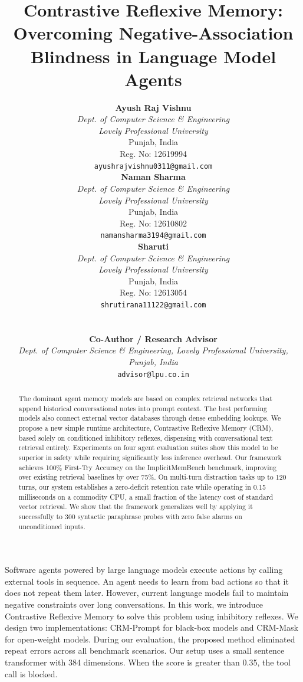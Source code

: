 \documentclass[10pt,conference]{IEEEtran}
\title{Contrastive Reflexive Memory: Overcoming Negative-Association Blindness in Language Model Agents}
\author{
\begin{minipage}{0.32\textwidth}
\centering
{\normalsize \textbf{Ayush Raj Vishnu}}\\[0.2ex]
{\small \textit{Dept. of Computer Science \& Engineering}}\\[0.1ex]
{\small \textit{Lovely Professional University}}\\[0.1ex]
{\small Punjab, India}\\[0.1ex]
{\small Reg. No: 12619994}\\[0.1ex]
{\footnotesize \texttt{ayushrajvishnu0311@gmail.com}}
\end{minipage}\hfill
\begin{minipage}{0.32\textwidth}
\centering
{\normalsize \textbf{Naman Sharma}}\\[0.2ex]
{\small \textit{Dept. of Computer Science \& Engineering}}\\[0.1ex]
{\small \textit{Lovely Professional University}}\\[0.1ex]
{\small Punjab, India}\\[0.1ex]
{\small Reg. No: 12610802}\\[0.1ex]
{\footnotesize \texttt{namansharma3194@gmail.com}}
\end{minipage}\hfill
\begin{minipage}{0.32\textwidth}
\centering
{\normalsize \textbf{Sharuti}}\\[0.2ex]
{\small \textit{Dept. of Computer Science \& Engineering}}\\[0.1ex]
{\small \textit{Lovely Professional University}}\\[0.1ex]
{\small Punjab, India}\\[0.1ex]
{\small Reg. No: 12613054}\\[0.1ex]
{\footnotesize \texttt{shrutirana11122@gmail.com}}
\end{minipage}\\[1.5ex]
\begin{minipage}{\textwidth}
\centering
{\normalsize \textbf{Co-Author / Research Advisor}}\\[0.2ex]
{\small \textit{Dept. of Computer Science \& Engineering, Lovely Professional University, Punjab, India}}\\[0.1ex]
{\footnotesize \texttt{advisor@lpu.co.in}}
\end{minipage}
}
\begin{document}
\maketitle

\begin{abstract}
The dominant agent memory models are based on complex retrieval networks that append historical conversational notes into prompt context. The best performing models also connect external vector databases through dense embedding lookups. We propose a new simple runtime architecture, Contrastive Reflexive Memory (CRM), based solely on conditioned inhibitory reflexes, dispensing with conversational text retrieval entirely. Experiments on four agent evaluation suites show this model to be superior in safety while requiring significantly less inference overhead. Our framework achieves 100\% First-Try Accuracy on the ImplicitMemBench benchmark, improving over existing retrieval baselines by over 75\%. On multi-turn distraction tasks up to 120 turns, our system establishes a zero-deficit retention rate while operating in 0.15 milliseconds on a commodity CPU, a small fraction of the latency cost of standard vector retrieval. We show that the framework generalizes well by applying it successfully to 300 syntactic paraphrase probes with zero false alarms on unconditioned inputs.
\end{abstract}

Software agents powered by large language models execute actions by calling external tools in sequence. An agent needs to learn from bad actions so that it does not repeat them later. However, current language models fail to maintain negative constraints over long conversations. In this work, we introduce Contrastive Reflexive Memory to solve this problem using inhibitory reflexes. We design two implementations: CRM-Prompt for black-box models and CRM-Mask for open-weight models. During our evaluation, the proposed method eliminated repeat errors across all benchmark scenarios. Our setup uses a small sentence transformer with 384 dimensions. When the score is greater than 0.35, the tool call is blocked.
\end{document}
